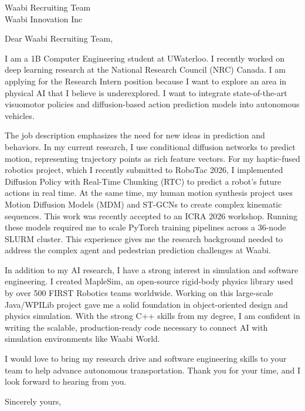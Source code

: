 \documentclass[
	parskip=half, %
	enlargefirstpage=true, %
]{scrlttr2} %
\begin{document}

\begin{letter}{
	Waabi Recruiting Team \\
	Waabi Innovation Inc
}

\opening{Dear Waabi Recruiting Team,}

I am a 1B Computer Engineering student at UWaterloo. I recently worked on deep learning research at the National Research Council (NRC) Canada. I am applying for the Research Intern position because I want to explore an area in physical AI that I believe is underexplored. I want to integrate state-of-the-art visuomotor policies and diffusion-based action prediction models into autonomous vehicles.

The job description emphasizes the need for new ideas in prediction and behaviors. In my current research, I use conditional diffusion networks to predict motion, representing trajectory points as rich feature vectors. For my haptic-fused robotics project, which I recently submitted to RoboTac 2026, I implemented Diffusion Policy with Real-Time Chunking (RTC) to predict a robot's future actions in real time. At the same time, my human motion synthesis project uses Motion Diffusion Models (MDM) and ST-GCNs to create complex kinematic sequences. This work was recently accepted to an ICRA 2026 workshop. Running these models required me to scale PyTorch training pipelines across a 36-node SLURM cluster. This experience gives me the research background needed to address the complex agent and pedestrian prediction challenges at Waabi.

In addition to my AI research, I have a strong interest in simulation and software engineering. I created MapleSim, an open-source rigid-body physics library used by over 500 FIRST Robotics teams worldwide. Working on this large-scale Java/WPILib project gave me a solid foundation in object-oriented design and physics simulation. With the strong C++ skills from my degree, I am confident in writing the scalable, production-ready code necessary to connect AI with simulation environments like Waabi World.

I would love to bring my research drive and software engineering skills to your team to help advance autonomous transportation. Thank you for your time, and I look forward to hearing from you.

Sincerely yours, \\


\end{letter}
\end{document}

